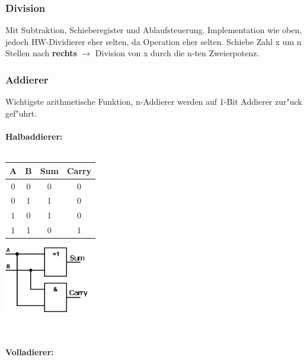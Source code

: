\subsubsection{Division}
Mit Subtraktion, Schieberegister und Ablaufsteuerung. 
Implementation wie oben, jedoch HW-Dividierer eher selten, da Operation eher selten. Schiebe Zahl x um n Stellen nach \textbf{rechts} $\rightarrow$ Division von x durch die n-ten Zweierpotenz.\\
\subsubsection{Addierer}
Wichtigste arithmetische Funktion, n-Addierer werden auf 1-Bit Addierer zur"uck gef"uhrt. \\ \\
\textbf{Halbaddierer:}\\ \\
\begin{minipage}{0.5\textwidth}
	\centering
	\begin{tabular}{|c | c | c | c |}
	\hline
	A & B & Sum & Carry\\
	\hline
	0 & 0 & 0 & 0\\
	\hline
	0 & 1 & 1 & 0\\
	\hline
	1 & 0 & 1 & 0\\
	\hline
	1 & 1 & 0 & 1\\
	\hline
	\end{tabular}
\end{minipage}
\begin{minipage}{0.9\textwidth}
	\centering
	\begin{flushleft}
	{\includegraphics[width=0.3\textwidth]{images/Arithmetik/halbaddierer.png}}
	\label{Fig: Halbaddierer}
	\end{flushleft}
\end{minipage}\\ \\

\textbf{Volladierer:}\\ \\

